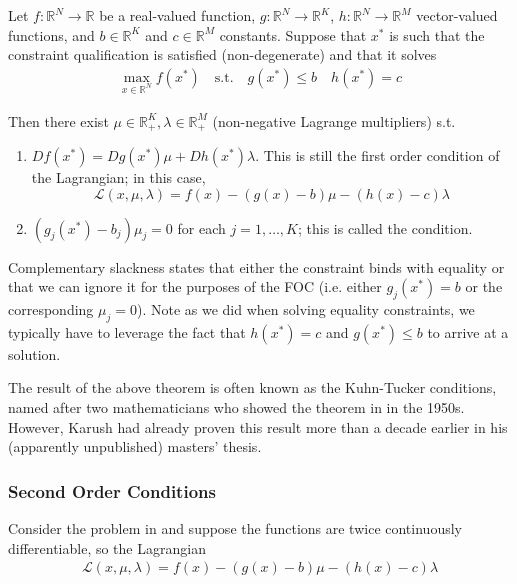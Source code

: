 \documentclass{article}
\begin{document}
\begin{theorem}\label{thm:lecture5_kkt}
  Let $f: \mathbb{R}^N \to \mathbb{R}$ be a real-valued function, $g: \mathbb{R}^N \to \mathbb{R}^K$, $h: \mathbb{R}^N \to \mathbb{R}^M$ vector-valued functions, and $b \in \mathbb{R}^K$ and $c \in \mathbb{R}^M$ constants. Suppose that $x^*$ is such that the constraint qualification is satisfied (non-degenerate) and that it solves
  \begin{align*}
    \max_{x \in \mathbb{R}^N} f(x^*)
    \quad
    \text{s.t.}
    \quad
    g(x^*) \le b
    \quad
    h(x^*) = c
  \end{align*}

  Then there exist $\mu \in \mathbb{R}^K_{+}, \lambda \in \mathbb{R}^M_{+}$ (non-negative Lagrange multipliers) s.t.
  \begin{enumerate}
    \item $Df(x^*) = Dg(x^*) \mu + Dh(x^*)\lambda$. This is still the first order condition of the Lagrangian; in this case,
      \[
        \mathcal{L}(x, \mu, \lambda) = f(x) - (g(x) - b)\mu - (h(x) - c) \lambda
      \]

    \item $(g_j(x^*) - b_j) \mu_j = 0$ for each $j = 1, \ldots, K$; this is called the  condition.
  \end{enumerate}
\end{theorem}

Complementary slackness states that either the constraint binds with equality or that we can ignore it for the purposes of the FOC (i.e. either $g_j(x^*) = b$ or the corresponding $\mu_j = 0$). Note as we did when solving equality constraints, we typically have to leverage the fact that $h(x^*) = c$ and $g(x^*) \le b$ to arrive at a solution.

\begin{remark}
  The result of the above theorem is often known as the Kuhn-Tucker conditions, named after two mathematicians who showed the theorem in in the 1950s. However, Karush had already proven this result more than a decade earlier in his (apparently unpublished) masters' thesis.
\end{remark}

\subsubsection{Second Order Conditions}
\label{ssub:second_order_conditions}

Consider the problem in  and suppose the functions are twice continuously differentiable, so the Lagrangian
\begin{align*}
  \mathcal{L}(x, \mu, \lambda) = f(x) - (g(x) - b)\mu - (h(x) - c) \lambda
\end{align*}
\end{document}
